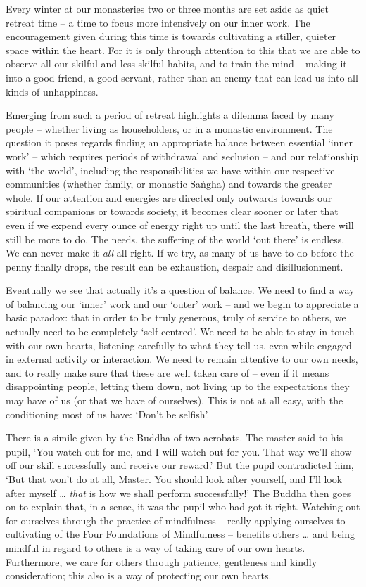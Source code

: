 

Every winter at our monasteries two or three months are set aside as quiet retreat time -- a time to focus more intensively on our inner work. The encouragement given during this time is towards cultivating a stiller, quieter space within the heart. For it is only through attention to this that we are able to observe all our skilful and less skilful habits, and to train the mind -- making it into a good friend, a good servant, rather than an enemy that can lead us into all kinds of unhappiness.

Emerging from such a period of retreat highlights a dilemma faced by many people -- whether living as householders, or in a monastic environment. The question it poses regards finding an appropriate balance between essential `inner work' -- which requires periods of withdrawal and seclusion -- and our relationship with `the world', including the responsibilities we have within our respective communities (whether family, or monastic Sa\.ngha) and towards the greater whole. If our attention and energies are directed only outwards towards our spiritual companions or towards society, it becomes clear sooner or later that even if we expend every ounce of energy right up until the last breath, there will still be more to do. The needs, the suffering of the world `out there' is endless. We can never make it \textit{all} all right. If we try, as many of us have to do before the penny finally drops, the result can be exhaustion, despair and disillusionment. 

Eventually we see that actually it's a question of balance. We need to find a way of balancing our `inner' work and our `outer' work -- and we begin to appreciate a basic paradox: that in order to be truly generous, truly of service to others, we actually need to be completely `self-centred'. We need to be able to stay in touch with our own hearts, listening carefully to what they tell us, even while engaged in external activity or interaction. We need to remain attentive to our own needs, and to really make sure that these are well taken care of -- even if it means disappointing people, letting them down, not living up to the expectations they may have of us (or that we have of ourselves). This is not at all easy, with the conditioning most of us have: `Don't be selfish'. 

There is a simile given by the Buddha of two acrobats. The master said to his pupil, `You watch out for me, and I will watch out for you. That way we'll show off our skill successfully and receive our reward.' But the pupil contradicted him, `But that won't do at all, Master. You should look after yourself, and I'll look after myself \ldots{} \textit{that} is how we shall perform successfully!' The Buddha then goes on to explain that, in a sense, it was the pupil who had got it right. Watching out for ourselves through the practice of mindfulness -- really applying ourselves to cultivating of the Four Foundations of Mindfulness -- benefits others \ldots{} and being mindful in regard to others is a way of taking care of our own hearts. Furthermore, we care for others through patience, gentleness and kindly consideration; this also is a way of protecting our own hearts.

